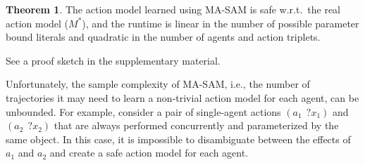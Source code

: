 \documentclass[letterpaper]{article} %
\newcommand{\eff}{\textit{eff}}
\theoremstyle{definition}
\newtheorem{theorem}{Theorem}
\theoremstyle{remark}
\newcommand{\lifted}{\textit{lifted}}
\newcommand{\realm}{\ensuremath{M^*}\xspace}
\newcommand{\iseff}{\text{IsEff}}
\newcommand{\masam}{\ac{MA-SAM}\xspace}
\begin{document}

 

\begin{theorem}
\label{lemma:ma-sam}
The action model learned using \masam is safe w.r.t.\  the real action model (\realm), and the runtime is linear in the number of possible parameter bound literals and quadratic in the number of agents and action triplets. 
\end{theorem}
\noindent See a proof sketch in the supplementary material. 


Unfortunately, the sample complexity of \masam, i.e., the number of trajectories it may need to learn a non-trivial action model for each agent, can be unbounded.  
For example, consider a pair of single-agent actions $(a_1~~ ?x_1)$ and $(a_2~~ ?x_2)$ that are always performed concurrently and parameterized by the same object. 
In this case, it is impossible to disambiguate between the effects of $a_1$ and $a_2$ and create a safe action model for each agent. 



\end{document}
